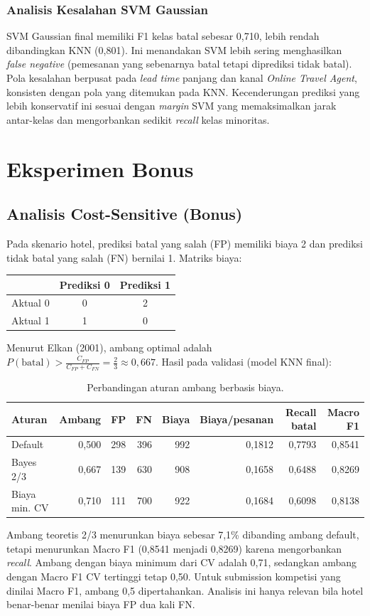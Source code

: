 \documentclass[12pt,a4paper]{article}
\begin{document}
\subsubsection{Analisis Kesalahan SVM Gaussian}
SVM Gaussian final memiliki F1 kelas batal sebesar 0,710, lebih rendah dibandingkan KNN (0,801). Ini menandakan SVM lebih sering menghasilkan \textit{false negative} (pemesanan yang sebenarnya batal tetapi diprediksi tidak batal). Pola kesalahan berpusat pada \textit{lead time} panjang dan kanal \textit{Online Travel Agent}, konsisten dengan pola yang ditemukan pada KNN. Kecenderungan prediksi yang lebih konservatif ini sesuai dengan \textit{margin} SVM yang memaksimalkan jarak antar-kelas dan mengorbankan sedikit \textit{recall} kelas minoritas.

\section{Eksperimen Bonus}
\subsection{Analisis Cost-Sensitive (Bonus)}
Pada skenario hotel, prediksi batal yang salah (FP) memiliki biaya 2 dan prediksi tidak batal yang salah (FN) bernilai 1. Matriks biaya:
\begin{center}\small\begin{tabular}{lcc}\toprule & Prediksi 0 & Prediksi 1\\\midrule Aktual 0 & 0 & 2\\ Aktual 1 & 1 & 0\\\bottomrule\end{tabular}\end{center}
Menurut Elkan (2001), ambang optimal adalah $P(\text{batal})>\frac{C_{FP}}{C_{FP}+C_{FN}}=\frac23\approx0{,}667$. Hasil pada validasi (model KNN final):
\begin{table}[H]\centering\small
\begin{tabular}{lrrrrrrr}
\toprule
Aturan & Ambang & FP & FN & Biaya & Biaya/pesanan & Recall batal & Macro F1\\
\midrule
Default & 0,500 & 298 & 396 & 992 & 0,1812 & 0,7793 & 0,8541\\
Bayes 2/3 & 0,667 & 139 & 630 & 908 & 0,1658 & 0,6488 & 0,8269\\
Biaya min. CV & 0,710 & 111 & 700 & 922 & 0,1684 & 0,6098 & 0,8138\\
\bottomrule
\end{tabular}
\caption{Perbandingan aturan ambang berbasis biaya.}
\end{table}
Ambang teoretis 2/3 menurunkan biaya sebesar 7,1\% dibanding ambang default, tetapi menurunkan Macro F1 (0,8541 menjadi 0,8269) karena mengorbankan \textit{recall}. Ambang dengan biaya minimum dari CV adalah 0,71, sedangkan ambang dengan Macro F1 CV tertinggi tetap 0,50. Untuk submission kompetisi yang dinilai Macro F1, ambang 0,5 dipertahankan. Analisis ini hanya relevan bila hotel benar-benar menilai biaya FP dua kali FN.
\end{document}
